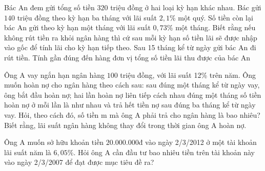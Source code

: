 \begin{bt}%
Bác An đem gửi tổng số tiền $320$ triệu đồng ở hai loại kỳ hạn khác nhau. Bác gửi $140$ triệu đồng theo kỳ hạn ba tháng với lãi suất $2,1\%$ một quý. Số tiền còn lại bác An gửi theo kỳ hạn một tháng với lãi suất $0,73\%$ một tháng. Biết rằng nếu không rút tiền ra khỏi ngân hàng thì cứ sau mỗi kỳ hạn số tiền lãi sẽ được nhập vào gốc để tính lãi cho kỳ hạn tiếp theo. Sau 15 tháng kể từ ngày gửi bác An đi rút tiền. Tính gần đúng đến hàng đơn vị tổng số tiền lãi thu được của bác An
\end{bt}
\begin{bt}%
Ông A vay ngắn hạn ngân hàng $100$ triệu đồng, với lãi suất 12\% trên năm. Ông muốn hoàn nợ cho ngân hàng theo cách sau: sau đúng một tháng kể từ ngày vay, ông bắt đầu hoàn nợ; hai lần hoàn nợ liên tiếp cách nhau đúng một tháng số tiền hoàn nợ ở mỗi lần là như nhau và trả hết tiền nợ sau đúng ba tháng kể từ ngày vay. Hỏi, theo cách đó, số tiền m mà ông A phải trả cho ngân hàng là bao nhiêu? Biết rằng, lãi suất ngân hàng không thay đổi trong thời gian ông A hoàn nợ.
\end{bt}
\begin{bt}%
Ông A muốn sở hữu khoản tiền $20.000.000$đ vào ngày 2/3/2012 ở một tài khoản lãi suất năm là $6,05\%$. Hỏi ông A cần đầu tư bao nhiêu tiền trên tài khoản này vào ngày 2/3/2007 để đạt được mục tiêu đề ra?
\end{bt}
